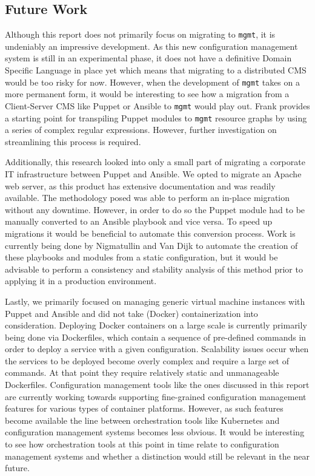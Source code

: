 \subsection{Future Work}\label{subsec:futurework}
Although this report does not primarily focus on migrating to \texttt{mgmt}, it is undeniably an impressive development. As this new configuration management system is still in an experimental phase, it does not have a definitive Domain Specific Language in place yet which means that migrating to a distributed CMS would be too risky for now. However, when the development of \texttt{mgmt} takes on a more permanent form, it would be interesting to see how a migration from a Client-Server CMS like Puppet or Ansible to \texttt{mgmt} would play out. Frank \cite{frank_2016} provides a starting point for transpiling Puppet modules to \texttt{mgmt} resource graphs by using a series of complex regular expressions. However, further investigation on streamlining this process is required.

Additionally, this research looked into only a small part of migrating a corporate IT infrastructure between Puppet and Ansible. We opted to migrate an Apache web server, as this product has extensive documentation and was readily available. The methodology posed was able to perform an in-place migration without any downtime. However, in order to do so the Puppet module had to be manually converted to an Ansible playbook and vice versa. To speed up migrations it would be beneficial to automate this conversion process. Work is currently being done by Nigmatullin and Van Dijk \cite{marat_2016} to automate the creation of these playbooks and modules from a static configuration, but it would be advisable to perform a consistency and stability analysis of this method prior to applying it in a production environment. 

Lastly, we primarily focused on managing generic virtual machine instances with Puppet and Ansible and did not take (Docker) containerization into consideration. Deploying Docker containers on a large scale is currently primarily being done via Dockerfiles, which contain a sequence of pre-defined commands in order to deploy a service with a given configuration. Scalability issues occur when the services to be deployed become overly complex and require a large set of commands. At that point they require relatively static and unmanageable Dockerfiles. Configuration management tools like the ones discussed in this report are currently working towards supporting fine-grained configuration management features for various types of container platforms. However, as such features become available the line between orchestration tools like Kubernetes \cite{kubernetes_2016} and configuration management systems becomes less obvious. It would be interesting to see how orchestration tools at this point in time relate to configuration management systems and whether a distinction would still be relevant in the near future.